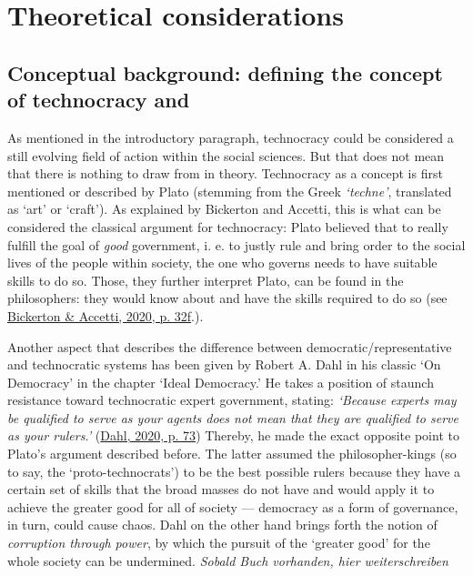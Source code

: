 \documentclass[
  12pt,
  english,
]{article}
\begin{document}
\newpage{}

\hypertarget{theoretical-considerations}{%
\section{Theoretical considerations}\label{theoretical-considerations}}

\hypertarget{conceptual-background-defining-the-concept-of-technocracy-and}{%
\subsection{Conceptual background: defining the concept of technocracy
and}\label{conceptual-background-defining-the-concept-of-technocracy-and}}

As mentioned in the introductory paragraph, technocracy could be
considered a still evolving field of action within the social sciences.
But that does not mean that there is nothing to draw from in theory.
Technocracy as a concept is first mentioned or described by Plato
(stemming from the Greek \emph{`techne'}, translated as `art' or
`craft'). As explained by Bickerton and Accetti, this is what can be
considered the classical argument for technocracy: Plato believed that
to really fulfill the goal of \emph{good} government, i. e. to justly
rule and bring order to the social lives of the people within society,
the one who governs needs to have suitable skills to do so. Those, they
further interpret Plato, can be found in the philosophers: they would
know about and have the skills required to do so (see
\protect\hyperlink{ref-bickerton2020technocracy}{Bickerton \& Accetti,
2020, p. 32f}.).

Another aspect that describes the difference between
democratic/representative and technocratic systems has been given by
Robert A. Dahl in his classic `On Democracy' in the chapter `Ideal
Democracy.' He takes a position of staunch resistance toward
technocratic expert government, stating: \emph{`Because experts may be
qualified to serve as your agents does not mean that they are qualified
to serve as your rulers.'}
(\protect\hyperlink{ref-dahl_onDemocracy}{Dahl, 2020, p. 73}) Thereby,
he made the exact opposite point to Plato's argument described before.
The latter assumed the philosopher-kings (so to say, the
`proto-technocrats') to be the best possible rulers because they have a
certain set of skills that the broad masses do not have and would apply
it to achieve the greater good for all of society --- democracy as a
form of governance, in turn, could cause chaos. Dahl on the other hand
brings forth the notion of \emph{corruption through power}, by which the
pursuit of the `greater good' for the whole society can be undermined.
\emph{Sobald Buch vorhanden, hier weiterschreiben}
\end{document}
